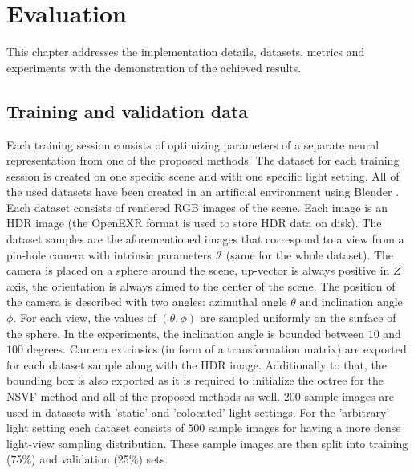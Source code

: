 
\chapter{Evaluation}
\label{chap:evaluation}

This chapter addresses the implementation details,
datasets, metrics and experiments with the demonstration of the achieved results.



\section{Training and validation data}
\label{sec:datasets}

Each training session consists of optimizing parameters of a separate neural representation from one of the proposed methods.
The dataset for each training session is created on one specific scene and with one specific light setting.
All of the used datasets have been created in an artificial environment using Blender \cite{blender}.
Each dataset consists of rendered RGB images of the scene.
Each image is an HDR image (the OpenEXR \cite{openexr} format is used to store HDR data on disk).
The dataset samples are the aforementioned images
that correspond to a view from a pin-hole camera with intrinsic parameters $\mathcal{I}$ (same for the whole dataset).
The camera is placed on a sphere around the scene,
up-vector is always positive in $Z$ axis,
the orientation is always aimed to the center of the scene.
The position of the camera is described with two angles: azimuthal angle $\theta$ and inclination angle $\phi$.
For each view, the values of $(\theta, \phi)$ are sampled uniformly on the surface of the sphere.
In the experiments, the inclination angle is bounded between $10$ and $100$ degrees.
Camera extrinsics (in form of a transformation matrix) are exported for each dataset sample along with the HDR image.
Additionally to that, the bounding box is also exported as it is required
to initialize the octree for the NSVF method and all of the proposed methods as well.
$200$ sample images are used in datasets with 'static' and 'colocated' light settings.
For the 'arbitrary' light setting each dataset consists of $500$ sample images
for having a more dense light-view sampling distribution.
These sample images are then split into training (75\%) and validation (25\%) sets.


